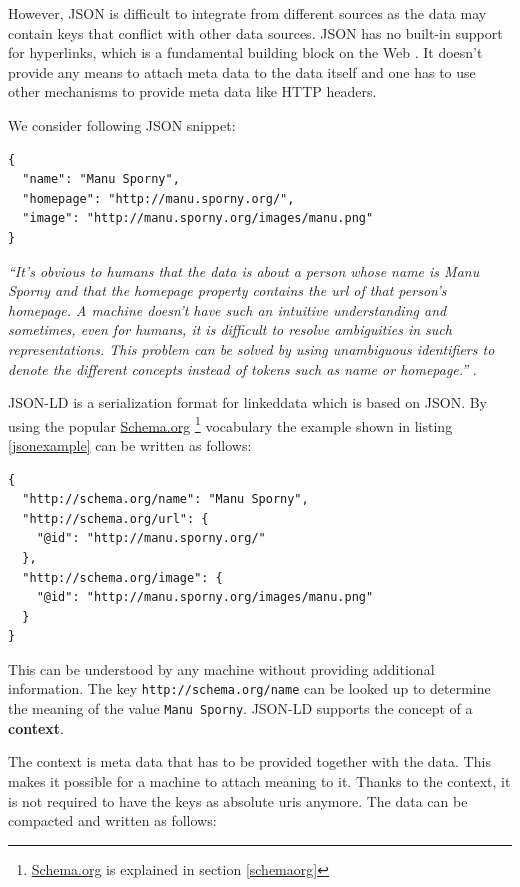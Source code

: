 However, JSON is difficult to integrate from different sources as the data may contain keys that conflict with other data sources. JSON has no built-in support for hyperlinks, which is a fundamental building block on the Web \citep{jsonldbasicconcepts}. It doesn't provide any means to attach meta data to the data itself and one has to use other mechanisms to provide meta data like HTTP headers.

We consider following JSON snippet:

\lstset{language=JSON}
\begin{lstlisting}[caption=Data of a person in the JSON format., label=jsonexample]
{
  "name": "Manu Sporny",
  "homepage": "http://manu.sporny.org/",
  "image": "http://manu.sporny.org/images/manu.png"
}
\end{lstlisting}

\textit{``It's obvious to humans that the data is about a person whose name is \textit{Manu Sporny} and that the homepage property contains the \gls{url} of that person's homepage. A machine doesn't have such an intuitive understanding and sometimes, even for humans, it is difficult to resolve ambiguities in such representations. This problem can be solved by using unambiguous identifiers to denote the different concepts instead of tokens such as name or homepage.''} \citep{jsonldbasicconcepts}.

JSON-LD is a serialization format for \gls{linkeddata} which is based on JSON. By using the popular \url{Schema.org} \footnote{\url{Schema.org} is explained in section \ref{schemaorg}} vocabulary the example shown in listing \ref{jsonexample} can be written as follows:

\lstset{language=JSON}
\begin{lstlisting}[caption=Data of a person in the JSON-LD format. \citep{jsonldbasicconcepts}, label=jsonldexample]
{
  "http://schema.org/name": "Manu Sporny",
  "http://schema.org/url": {
    "@id": "http://manu.sporny.org/"
  },
  "http://schema.org/image": {
    "@id": "http://manu.sporny.org/images/manu.png"
  }
}
\end{lstlisting}

This can be understood by any machine without providing additional information. The key \lstinline{http://schema.org/name} can be looked up to determine the meaning of the value \lstinline{Manu Sporny}. JSON-LD supports the concept of a \textbf{context}.

The context is meta data that has to be provided together with the data. This makes it possible for a machine to attach meaning to it. Thanks to the context, it is not required to have the keys as absolute \gls{uri}s anymore. The data can be compacted and written as follows:

